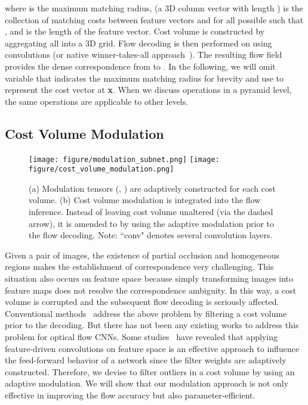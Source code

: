 \documentclass[runningheads]{llncs}
\begin{document}
where  is the maximum matching radius,  (a 3D column vector with length ) is the collection of matching costs between feature vectors  and  for all possible  such that , and  is the length of the feature vector. 
Cost volume  is constructed by aggregating all  into a 3D grid. Flow decoding is then performed on  using convolutions (or native winner-takes-all approach~\cite{Kang01}). The resulting flow field  provides the dense correspondence from  to .
In the following, we will omit variable  that indicates the maximum matching radius for brevity and use  to represent the cost vector at {\bf x}. When we discuss operations in a pyramid level, the same operations are applicable to other levels.

\subsection{Cost Volume Modulation}
\label{sec:cost volume modulation}
\begin{figure*}[t]
\centering
	\texttt{[image: figure/modulation\_subnet.png]}
	\texttt{[image: figure/cost\_volume\_modulation.png]} 
\caption{(a) Modulation tensors (, ) are adaptively constructed for each cost volume. (b) Cost volume modulation is integrated into the flow inference. Instead of leaving cost volume  unaltered (via the dashed arrow), it is amended to  by using the adaptive modulation prior to the flow decoding. Note: ``conv" denotes several convolution layers.}
\label{fig:cost volume modulation}
\end{figure*}

Given a pair of images, the existence of partial occlusion and homogeneous regions makes the establishment of correspondence very challenging. This situation also occurs on feature space because simply transforming images into feature maps does not resolve the correspondence ambiguity. 
In this way, a cost volume is corrupted and the subsequent flow decoding is seriously affected. 
Conventional methods~\cite{Rhemann11,Xu17} address the above problem by filtering a cost volume prior to the decoding. 
But there has not been any existing works to address this problem for optical flow CNNs.
Some studies~\cite{Brabandere16,Hui18,Hur19} have revealed that applying feature-driven convolutions on feature space is an effective approach to influence the feed-forward behavior of a network since the filter weights are adaptively constructed. Therefore, we devise to filter outliers in a cost volume by using an adaptive modulation. We will show that our modulation approach is not only effective in improving the flow accuracy but also parameter-efficient.
\end{document}
